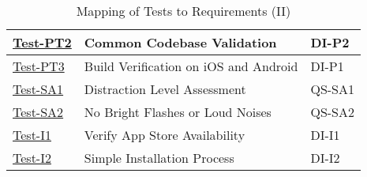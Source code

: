 \documentclass[12pt, titlepage]{article}
\begin{document}
\begin{table}[htpb!]
\begin{tabular}{|l|p{8cm}|p{3cm}|}
        \hline
        \hyperref[itm:Test-PT2]{Test-PT2} & Common Codebase Validation & DI-P2 \\
        \hline
        \hyperref[itm:Test-PT3]{Test-PT3} & Build Verification on iOS and Android & DI-P1\\
        \hline
        \hyperref[itm:Test-SA1]{Test-SA1} & Distraction Level Assessment & QS-SA1 \\
        \hline
        \hyperref[itm:Test-SA2]{Test-SA2} & No Bright Flashes or Loud Noises & QS-SA2 \\
        \hline
        \hyperref[itm:Test-I1]{Test-I1} & Verify App Store Availability & DI-I1 \\
        \hline
        \hyperref[itm:Test-I2]{Test-I2} & Simple Installation Process & DI-I2 \\
        \hline

        \hline
    \end{tabular}
    \caption{Mapping of Tests to Requirements (II)}
    \label{tab:test_requirements2}
\end{table}
\end{document}
